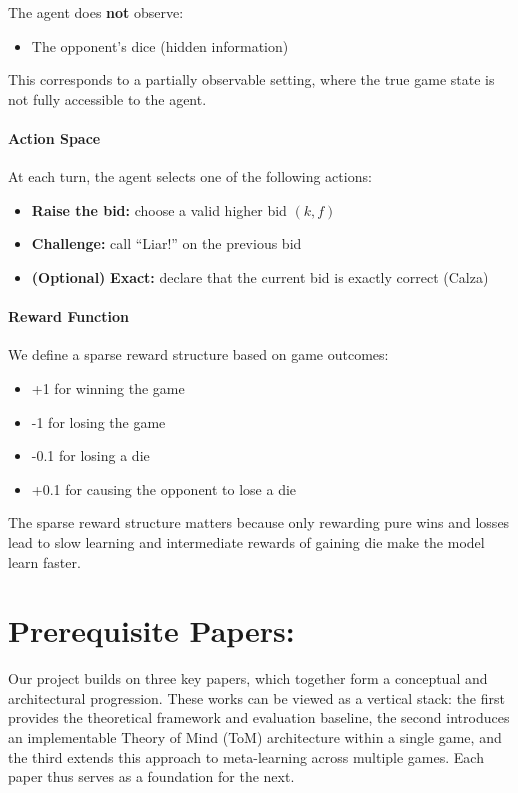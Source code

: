 \documentclass{article}
\begin{document}
\noindent The agent does \textbf{not} observe:
\begin{itemize}
    \item The opponent’s dice (hidden information)
\end{itemize}

\noindent This corresponds to a partially observable setting, where the true game state is not fully accessible to the agent.

\paragraph{Action Space}

At each turn, the agent selects one of the following actions:
\begin{itemize}
    \item \textbf{Raise the bid:} choose a valid higher bid $(k, f)$
    \item \textbf{Challenge:} call ``Liar!'' on the previous bid
    \item \textbf{(Optional)} \textbf{Exact:} declare that the current bid is exactly correct (Calza)
\end{itemize}


\paragraph{Reward Function}

We define a sparse reward structure based on game outcomes:
\begin{itemize}
    \item +1 for winning the game
    \item -1 for losing the game
    \item -0.1 for losing a die
    \item +0.1 for causing the opponent to lose a die
\end{itemize}
The sparse reward structure matters because only rewarding pure wins and losses lead to slow learning and intermediate rewards of gaining die make the model learn faster. 

\section{Prerequisite Papers:}


Our project builds on three key papers, which together form a conceptual and architectural progression. These works can be viewed as a vertical stack: the first provides the theoretical framework and evaluation baseline, the second introduces an implementable Theory of Mind (ToM) architecture within a single game, and the third extends this approach to meta-learning across multiple games. Each paper thus serves as a foundation for the next.
\end{document}
